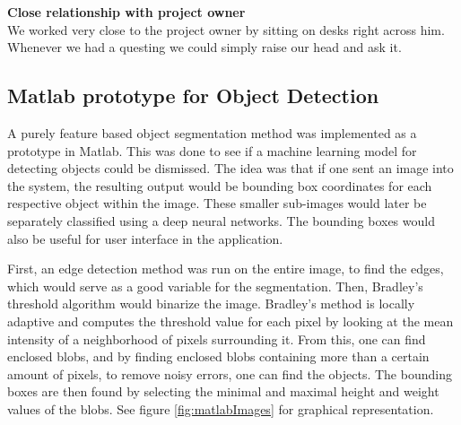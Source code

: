 \textbf{Close relationship with project owner} \\
We worked very close to the project owner by sitting on desks right across him. Whenever we had a questing we could simply raise our head and ask it.

\subsection{Matlab prototype for Object Detection}
A purely feature based object segmentation method was implemented as a prototype in Matlab. This was done to see if a machine learning model for detecting objects could be dismissed. 
The idea was that if one sent an image into the system, the resulting output would be bounding box coordinates for each respective object within the image. These smaller sub-images would later be separately classified using a deep neural networks. The bounding boxes would also be useful for user interface in the application. 

First, an edge detection method was run on the entire image, to find the edges, which would serve as a good variable for the segmentation. Then, Bradley's threshold algorithm \cite{Bradley} would binarize the image. Bradley's method is locally adaptive and computes the threshold value for each pixel by looking at the mean intensity of a neighborhood of pixels surrounding it.  From this, one can find enclosed blobs, and by finding enclosed blobs containing more than a certain amount of pixels, to remove noisy errors, one can find the objects. The bounding boxes are then found by selecting the minimal and maximal height and weight values of the blobs. See figure \ref{fig:matlabImages} for graphical representation.

